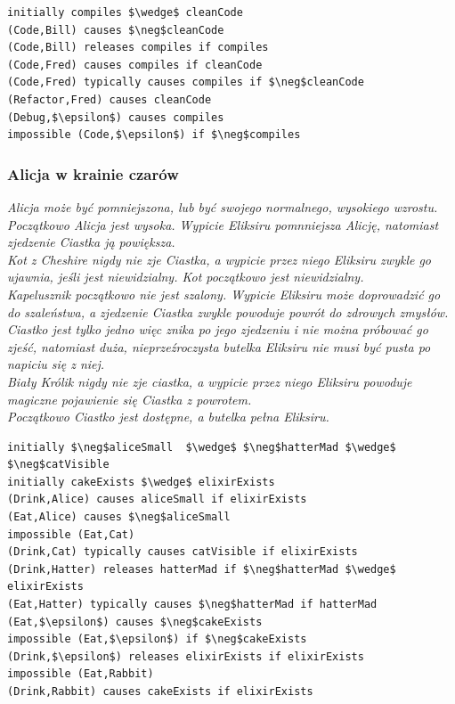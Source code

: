 \documentclass{article}
\begin{document}
\bigskip
{}
\begin{lstlisting}[mathescape=true]
initially compiles $\wedge$ cleanCode
(Code,Bill) causes $\neg$cleanCode
(Code,Bill) releases compiles if compiles
(Code,Fred) causes compiles if cleanCode
(Code,Fred) typically causes compiles if $\neg$cleanCode
(Refactor,Fred) causes cleanCode
(Debug,$\epsilon$) causes compiles
impossible (Code,$\epsilon$) if $\neg$compiles
\end{lstlisting}

\subsubsection{Alicja w krainie czarów}


\textit{Alicja może być pomniejszona, lub być swojego normalnego, wysokiego wzrostu. Początkowo Alicja jest wysoka. Wypicie Eliksiru pomnniejsza Alicję, natomiast zjedzenie Ciastka ją powiększa.
\\
Kot z Cheshire nigdy nie zje Ciastka, a wypicie przez niego Eliksiru zwykle go ujawnia, jeśli jest niewidzialny. Kot początkowo jest niewidzialny.
\\
Kapelusznik początkowo nie jest szalony. Wypicie Eliksiru może doprowadzić go do szaleństwa, a zjedzenie Ciastka zwykle powoduje powrót do zdrowych zmysłów.
\\
Ciastko jest tylko jedno więc znika po jego zjedzeniu i nie można próbować go zjeść, natomiast duża, nieprzeźroczysta butelka Eliksiru nie musi być pusta po napiciu się z niej.
\\
Biały Królik nigdy nie zje ciastka, a wypicie przez niego Eliksiru powoduje magiczne pojawienie się Ciastka z powrotem.
\\
Początkowo Ciastko jest dostępne, a butelka pełna Eliksiru.}

\bigskip
{}
\begin{lstlisting}[mathescape=true, breaklines=true]
initially $\neg$aliceSmall  $\wedge$ $\neg$hatterMad $\wedge$ $\neg$catVisible
initially cakeExists $\wedge$ elixirExists
(Drink,Alice) causes aliceSmall if elixirExists
(Eat,Alice) causes $\neg$aliceSmall
impossible (Eat,Cat)
(Drink,Cat) typically causes catVisible if elixirExists
(Drink,Hatter) releases hatterMad if $\neg$hatterMad $\wedge$ elixirExists
(Eat,Hatter) typically causes $\neg$hatterMad if hatterMad
(Eat,$\epsilon$) causes $\neg$cakeExists
impossible (Eat,$\epsilon$) if $\neg$cakeExists
(Drink,$\epsilon$) releases elixirExists if elixirExists
impossible (Eat,Rabbit)
(Drink,Rabbit) causes cakeExists if elixirExists
\end{lstlisting}
\end{document}
